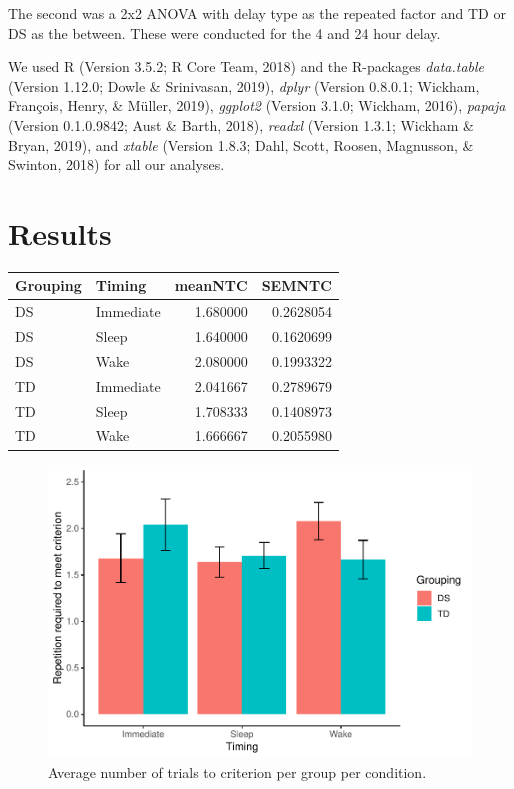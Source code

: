 \documentclass[man]{apa6}
\begin{document}
The second was a 2x2 ANOVA with delay type as the repeated factor and TD
or DS as the between. These were conducted for the 4 and 24 hour delay.

We used R (Version 3.5.2; R Core Team, 2018) and the R-packages
\emph{data.table} (Version 1.12.0; Dowle \& Srinivasan, 2019),
\emph{dplyr} (Version 0.8.0.1; Wickham, François, Henry, \& Müller,
2019), \emph{ggplot2} (Version 3.1.0; Wickham, 2016), \emph{papaja}
(Version 0.1.0.9842; Aust \& Barth, 2018), \emph{readxl} (Version 1.3.1;
Wickham \& Bryan, 2019), and \emph{xtable} (Version 1.8.3; Dahl, Scott,
Roosen, Magnusson, \& Swinton, 2018) for all our analyses.

\section{Results}\label{results}

\begin{tabular}{l|l|r|r}
\hline
Grouping & Timing & meanNTC & SEMNTC\\
\hline
DS & Immediate & 1.680000 & 0.2628054\\
\hline
DS & Sleep & 1.640000 & 0.1620699\\
\hline
DS & Wake & 2.080000 & 0.1993322\\
\hline
TD & Immediate & 2.041667 & 0.2789679\\
\hline
TD & Sleep & 1.708333 & 0.1408973\\
\hline
TD & Wake & 1.666667 & 0.2055980\\
\hline
\end{tabular}

\begin{figure}
\centering
\includegraphics{Midterm_in_papaja_files/figure-latex/NumberToCriterion-1.pdf}
\caption{\label{fig:NumberToCriterion}Average number of trials to criterion
per group per condition.}
\end{figure}
\end{document}
